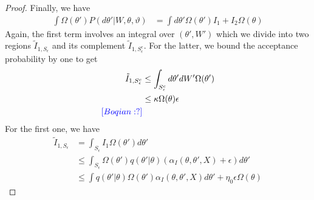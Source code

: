 \begin{proof}
Finally, we have
\begin{align*}
  \int \Omega(\theta') P(d\theta'| W, \theta, \vartheta)  
  &= \int d\theta' \Omega(\theta') I_1 + I_2 \Omega(\theta)
\end{align*}
Again, the first term involves an integral over $(\theta',W')$ which we 
divide into two regions $\tilde{I}_{1,S_\epsilon}$ and its complement 
$\tilde{I}_{1,S^c_\epsilon}$. For the latter, we bound the acceptance probability 
by one to get
\begin{align*}
  \tilde{I}_{1,S^c_\epsilon} &\le  \int_{S^c_\epsilon} d\theta'dW' \Omega(\theta')\\
  & \leq \kappa \Omega(\theta) \epsilon\\
  \textcolor{blue}{[Boqian: ?]}
\end{align*}
For the first one, we have 
\begin{align*}
\tilde{I}_{1,S_\epsilon} &= \int_{S_\epsilon} I_1 \Omega(\theta') d\theta'\\
& \leq \int_{S_\epsilon} \Omega(\theta')q(\theta' | \theta) (\alpha_I(\theta, \theta', X) + \epsilon) d\theta' \\
& \leq \int q(\theta' | \theta) \Omega(\theta')\alpha_I(\theta, \theta', X) d\theta' + \eta_0 \epsilon \Omega(\theta)
\end{align*}


\end{proof}
